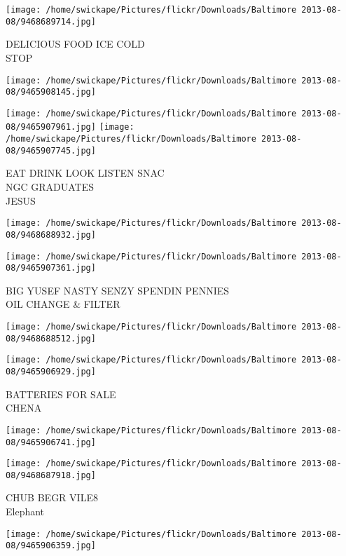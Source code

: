 \documentclass[10pt,letterpaper]{article}
\begin{document}
\vspace{0.25in}
\texttt{[image: /home/swickape/Pictures/flickr/Downloads/Baltimore 2013-08-08/9468689714.jpg]}

DELICIOUS FOOD ICE COLD\\
STOP
\pagebreak

\texttt{[image: /home/swickape/Pictures/flickr/Downloads/Baltimore 2013-08-08/9465908145.jpg]}

\vspace{0.25in}
\texttt{[image: /home/swickape/Pictures/flickr/Downloads/Baltimore 2013-08-08/9465907961.jpg]}
\texttt{[image: /home/swickape/Pictures/flickr/Downloads/Baltimore 2013-08-08/9465907745.jpg]}

EAT DRINK LOOK LISTEN SNAC\\
NGC GRADUATES\\
JESUS
\pagebreak

\texttt{[image: /home/swickape/Pictures/flickr/Downloads/Baltimore 2013-08-08/9468688932.jpg]}

\vspace{0.25in}
\texttt{[image: /home/swickape/Pictures/flickr/Downloads/Baltimore 2013-08-08/9465907361.jpg]}

BIG YUSEF NASTY SENZY SPENDIN PENNIES\\
OIL CHANGE \& FILTER
\pagebreak

\texttt{[image: /home/swickape/Pictures/flickr/Downloads/Baltimore 2013-08-08/9468688512.jpg]}

\vspace{0.25in}
\texttt{[image: /home/swickape/Pictures/flickr/Downloads/Baltimore 2013-08-08/9465906929.jpg]}

BATTERIES FOR SALE\\
CHENA
\pagebreak

\texttt{[image: /home/swickape/Pictures/flickr/Downloads/Baltimore 2013-08-08/9465906741.jpg]}

\vspace{0.25in}
\texttt{[image: /home/swickape/Pictures/flickr/Downloads/Baltimore 2013-08-08/9468687918.jpg]}

CHUB BEGR VILE8\\
Elephant
\pagebreak

\texttt{[image: /home/swickape/Pictures/flickr/Downloads/Baltimore 2013-08-08/9465906359.jpg]}
\end{document}
